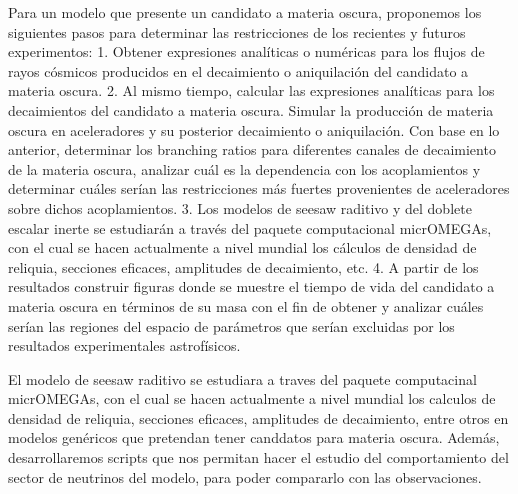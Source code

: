 \newpage{}
Para un modelo que presente un candidato a materia oscura, proponemos los siguientes pasos para determinar las restricciones de los recientes y futuros experimentos:
1. Obtener expresiones analíticas o numéricas para los flujos de rayos cósmicos producidos en el decaimiento o aniquilación del candidato a materia oscura.
2. Al mismo tiempo, calcular las expresiones analíticas para los decaimientos del candidato a materia oscura. Simular la producción de materia oscura en aceleradores  y su posterior decaimiento o aniquilación. Con base en lo anterior, determinar los branching ratios para diferentes canales de decaimiento de la materia oscura, analizar cuál es la dependencia con los acoplamientos y determinar cuáles serían las restricciones más fuertes provenientes de aceleradores sobre dichos acoplamientos. 
3. Los modelos de seesaw raditivo y del doblete escalar inerte se estudiarán a través del paquete computacional micrOMEGAs, con el cual se hacen actualmente a nivel mundial los cálculos de densidad de reliquia, secciones eficaces, amplitudes de decaimiento, etc.
4. A partir de los resultados construir figuras donde se muestre el tiempo de vida del candidato a materia oscura en términos de su masa con el fin de obtener y analizar cuáles serían las regiones del espacio de parámetros que serían excluidas por los resultados experimentales astrofísicos. 

El modelo de seesaw raditivo se estudiara a traves del paquete computacinal micrOMEGAs, con el cual se hacen actualmente a nivel mundial los calculos de densidad de reliquia, secciones eficaces, amplitudes de decaimiento, entre otros en modelos genéricos que pretendan tener canddatos para materia oscura. Además, desarrollaremos scripts que nos permitan hacer el estudio del comportamiento del sector de neutrinos del modelo, para poder compararlo con las observaciones.

